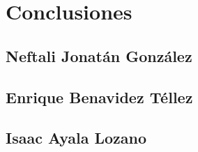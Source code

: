 \section{Conclusiones}

\subsection{Neftali Jonatán González}

\subsection{Enrique Benavidez Téllez}

\subsection{Isaac Ayala Lozano}
